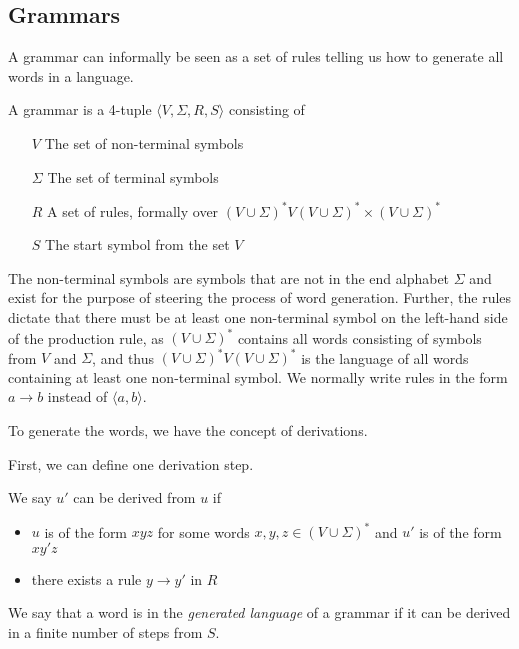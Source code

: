 \subsection{Grammars}\label{subsec:grammars}

A grammar can informally be seen as a set of rules telling us how to generate all words in a language.

\begin{define}[Grammar]
    A grammar is a 4-tuple $\langle V, \Sigma, R, S \rangle$ consisting of
    \begin{itemize}
        \item[$V$] The set of non-terminal symbols
        \item[$\Sigma$] The set of terminal symbols
        \item[$R$] A set of rules, formally over $(V \cup \Sigma)^{*}V(V \cup \Sigma)^{*} \times (V \cup \Sigma)^{*}$
        \item[$S$] The start symbol from the set $V$
    \end{itemize}
\end{define}

The non-terminal symbols are symbols that are not in the end alphabet $\Sigma$ and exist for the purpose of steering the process of word generation.
Further, the rules dictate that there must be at least one non-terminal symbol on the left-hand side of the production rule, as $(V \cup \Sigma)^*$ contains all words consisting of symbols from $V$ and $\Sigma$, and thus $(V \cup \Sigma)^{*}V(V \cup \Sigma)^{*}$ is the language of all words containing at least one non-terminal symbol.
We normally write rules in the form $a \to b$ instead of $\langle a, b \rangle$.

To generate the words, we have the concept of derivations.
\begin{define}[Derivation]
    First, we can define one derivation step.

    We say $u'$ can be derived from $u$ if
    \begin{itemize}
        \setlength\itemsep{0.2em}
        \item $u$ is of the form $xyz$ for some words $x, y, z \in (V \cup \Sigma)^*$ and $u'$ is of the form $xy'z$
        \item there exists a rule $y \to y'$ in $R$
    \end{itemize}

    We say that a word is in the \emph{generated language} of a grammar if it can be derived in a finite number of steps from $S$.
\end{define}

